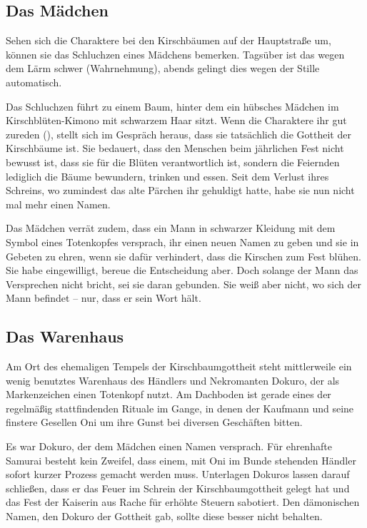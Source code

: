 {		\subsection{Das Mädchen}

			Sehen sich die Charaktere bei den Kirschbäumen auf der Hauptstraße um, können sie das Schluchzen eines Mädchens bemerken. Tagsüber ist das wegen dem Lärm schwer (Wahrnehmung), abends gelingt dies wegen der Stille automatisch.

			Das Schluchzen führt zu einem Baum, hinter dem ein hübsches Mädchen im Kirschblüten-Kimono mit schwarzem Haar sitzt. Wenn die Charaktere ihr gut zureden (), stellt sich im Gespräch heraus, dass sie tatsächlich die Gottheit der Kirschbäume ist. Sie bedauert, dass den Menschen beim jährlichen Fest nicht bewusst ist, dass sie für die Blüten verantwortlich ist, sondern die Feiernden lediglich die Bäume bewundern, trinken und essen. Seit dem Verlust ihres Schreins, wo zumindest das alte Pärchen ihr gehuldigt hatte, habe sie nun nicht mal mehr einen Namen.

			Das Mädchen verrät zudem, dass ein Mann in schwarzer Kleidung mit dem Symbol eines Totenkopfes versprach, ihr einen neuen Namen zu geben und sie in Gebeten zu ehren, wenn sie dafür verhindert, dass die Kirschen zum Fest blühen. Sie habe eingewilligt, bereue die Entscheidung aber. Doch solange der Mann das Versprechen nicht bricht, sei sie daran gebunden. Sie weiß aber nicht, wo sich der Mann befindet -- nur, dass er sein Wort hält.

		\subsection{Das Warenhaus}

			Am Ort des ehemaligen Tempels der Kirschbaumgottheit steht mittlerweile ein wenig benutztes Warenhaus des Händlers und Nekromanten Dokuro, der als Markenzeichen einen Totenkopf nutzt. Am Dachboden ist gerade eines der regelmäßig stattfindenden Rituale im Gange, in denen der Kaufmann und seine finstere Gesellen Oni um ihre Gunst bei diversen Geschäften bitten.

			Es war Dokuro, der dem Mädchen einen Namen versprach. Für ehrenhafte Samurai besteht kein Zweifel, dass einem, mit Oni im Bunde stehenden Händler sofort kurzer Prozess gemacht werden muss. Unterlagen Dokuros lassen darauf schließen, dass er das Feuer im Schrein der Kirschbaumgottheit gelegt hat und das Fest der Kaiserin aus Rache für erhöhte Steuern sabotiert. Den dämonischen Namen, den Dokuro der Gottheit gab, sollte diese besser nicht behalten.

}
